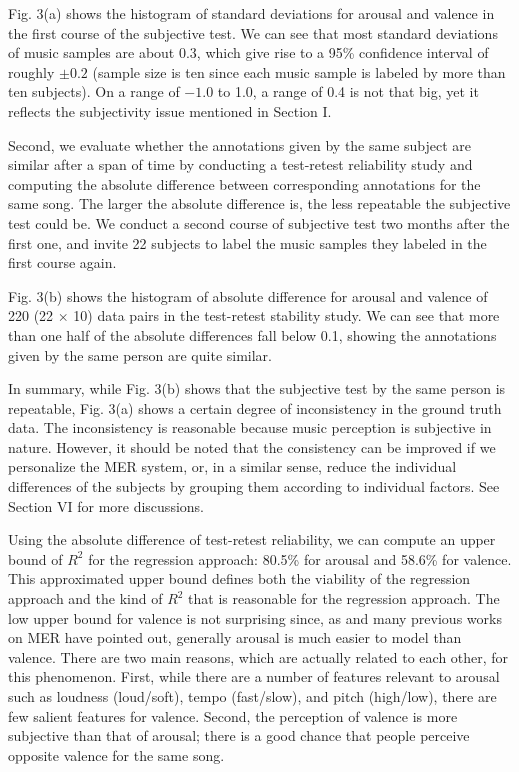 \documentclass[journal, twoside]{IEEEtran}
\begin{document}
Fig. 3(a) shows the histogram of standard deviations for arousal and valence in the first course of the subjective test. We can see that most standard deviations of music samples are about 0.3, which give rise to a 95\% confidence interval \cite{32} of roughly \(\pm{0.2}\) (sample size is ten since each music sample is labeled by more than ten subjects). On a range of \(-1.0\) to 1.0, a range of 0.4 is not that big, yet it reflects the subjectivity issue
mentioned in Section I.

Second, we evaluate whether the annotations given by the same subject are similar after a span of time by conducting a test-retest reliability study \cite{33} and computing the absolute difference between corresponding annotations for the same song. The larger the absolute difference is, the less repeatable the subjective test could be. We conduct a second course of subjective test two months after the first one, and invite 22 subjects to label the music samples they labeled in the first course again.

Fig. 3(b) shows the histogram of absolute difference for arousal and valence of 220 (22 \(\times\) 10) data pairs in the test-retest stability study. We can see that more than one half of the absolute differences fall below 0.1, showing the annotations given by the same person are quite similar.

In summary, while Fig. 3(b) shows that the subjective test by the same person is repeatable, Fig. 3(a) shows a certain degree of inconsistency in the ground truth data. The inconsistency is reasonable because music perception is subjective in nature. However, it should be noted that the consistency can be improved if we personalize the MER system, or, in a similar sense, reduce the individual differences of the subjects by grouping them according to individual factors. See Section VI for more discussions.

Using the absolute difference of test-retest reliability, we can compute an upper bound of \(R^2\) for the regression approach: 80.5\% for arousal and 58.6\% for valence. This approximated upper bound defines both the viability of the regression approach and the kind of \(R^2\) that is reasonable for the regression approach. The low upper bound for valence is not surprising since, as \cite{11} and many previous works on MER have pointed out, generally arousal is much easier to model than valence. There are two main reasons, which are actually related to each other, for this phenomenon. First, while there are a number of features relevant to arousal such as loudness (loud/soft), tempo (fast/slow), and pitch (high/low), there are few salient features for valence. Second, the perception of valence is more subjective than that of arousal; there is a good chance that people perceive opposite valence for the same song.
\end{document}
